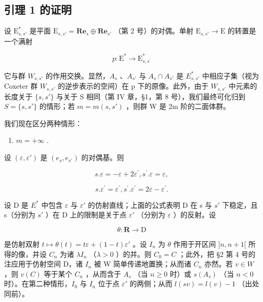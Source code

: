 \subsection{引理 1 的证明}

设 \(\mathrm{E}_{s,s'}^*\) 是平面 \(\mathrm{E}_{s,s'} = \mathbf{Re}_s\oplus \mathbf{Re}_{s'}\) （第 2 号）的对偶。单射 \(\mathrm{E}_{s,s'}\to \mathrm{E}\) 的转置是一个满射

\[
p: \mathrm{E} ^ {*} \to \mathrm{E} _ {s, s ^ {\prime}} ^ {*}
\]

它与群 \(W_{s,s'}\) 的作用交换。显然，\(A_{s}\) 、\(A_{s'}\) 与 \(A_{s} \cap A_{s'}\) 是 \(E_{s,s'}^{*}\) 中相应子集（视为 Coxeter 群 \(W_{s,s'}\) 的逆步表示的空间）在 p 下的原像。此外，由于 \(W_{s,s'}\) 中元素的长度关于 \(\{s,s'\}\) 与关于 S 相同（第 IV 章，§1，第 8 号），我们最终可化归到 \(S = \{s,s'\}\) 的情形；若 \(m = m(s,s')\) ，则群 W 是 2m 阶的二面体群。

我们现在区分两种情形：

\begin{enumerate}
\def\labelenumi{\alph{enumi})}
\tightlist
\item
  \(m = +\infty\) .
\end{enumerate}

设 \((\varepsilon, \varepsilon')\) 是 \((e_s, e_{s'})\) 的对偶基。则

\[
s. \varepsilon = - \varepsilon + 2 \varepsilon^ {\prime}, s ^ {\prime}. \varepsilon = \varepsilon ,
\]

\[
s. \varepsilon^ {\prime} = \varepsilon^ {\prime}, s ^ {\prime}. \varepsilon^ {\prime} = 2 \varepsilon - \varepsilon^ {\prime}.
\]

设 D 是 \(E^{*}\) 中包含 \(\varepsilon\) 与 \(\varepsilon'\) 的仿射直线；上面的公式表明 D 在 s 与 \(s'\) 下稳定，且 s（分别为 \(s'\) ）在 D 上的限制是关于点 \(\varepsilon'\) （分别为 \(\varepsilon\) ）的反射。设

\[
\theta : \mathbf {R} \to \mathrm{D}
\]

是仿射双射 \(t \mapsto \theta(t) = t\varepsilon + (1 - t)\varepsilon'\) 。设 \(I_n\) 为 \(\theta\) 作用于开区间 \(]n, n + 1[\) 所得的像，并设 \(C_n\) 为诸 \(\lambda I_n\) （\(\lambda > 0\) ）的并。则 \(C_0 = C\) ；此外，把 §2 第 4 号的注应用于仿射空间 D，诸 \(I_n\) 被 W 简单传递地置换；从而诸 \(C_n\) 亦然。若 \(v \in W\) ，则 \(v(C)\) 等于某个 \(C_n\) ，从而含于 \(A_s\) （当 \(n \geqslant 0\) 时）或 \(s(A_s)\) （当 \(n < 0\) 时）。在第二种情形，\(I_0\) 与 \(I_n\) 位于点 \(\varepsilon'\) 的两侧；从而 \(l(sv) = l(v) - 1\) （出处同前）。

